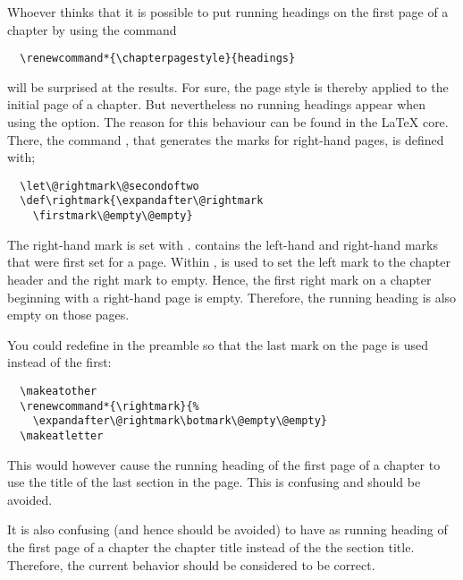 \begin{Explain}
  Whoever thinks that it is possible to put running headings on the
  first page of a chapter by using the command
\begin{lstlisting}
  \renewcommand*{\chapterpagestyle}{headings}
\end{lstlisting}
  will be surprised at the results.
  For sure, the page style  is thereby applied to the
  initial page of a chapter. But nevertheless no running headings appear
  when using the  option.
  The reason for this behaviour can be found in the \LaTeX{}
  core. There, the command , that generates the marks
  for right-hand pages, is defined with;
\begin{lstlisting}
  \let\@rightmark\@secondoftwo
  \def\rightmark{\expandafter\@rightmark
    \firstmark\@empty\@empty}
\end{lstlisting}
  The right-hand mark is set with . 
  contains the  left-hand  and right-hand  marks that were first set
  for a page. Within ,  is used to set
  the left mark to the chapter header and the right mark to empty.
  Hence, the first right
  mark on  a chapter beginning with a right-hand page is empty. Therefore,
  the running heading is also empty on those pages.

  You could redefine  in the preamble so that the
  last mark on the page is used instead of the first:
\begin{lstlisting}
  \makeatother
  \renewcommand*{\rightmark}{%
    \expandafter\@rightmark\botmark\@empty\@empty}
  \makeatletter
\end{lstlisting}
  This would however cause the running heading of the first page of a
  chapter to use the title of the last section in the page. This is
  confusing and should be avoided.

  It is also confusing (and hence should be avoided) to have as
  running heading of the first page of a chapter the chapter title
  instead of the the section title. Therefore, the current behavior
  should be considered to be correct.
\end{Explain}
%
%
%
%
%


